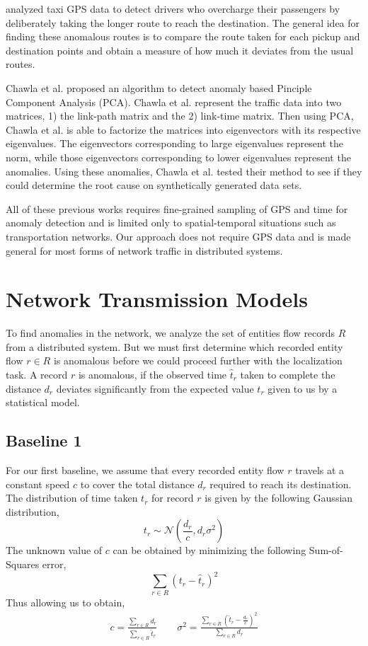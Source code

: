 \documentclass[conference]{IEEEtran.1.8}
\begin{document}
\cite{Ge2011,Zhang2011,Zhang2012} analyzed taxi GPS data to detect drivers who overcharge their passengers by deliberately taking the longer route to reach the destination. The general idea for finding these anomalous routes is to compare the route taken for each pickup and destination points and obtain a measure of how much it deviates from the usual routes.

Chawla et al. \cite{Chawla2012} proposed an algorithm to detect anomaly based Pinciple Component Analysis (PCA). Chawla et al. \cite{Chawla2012} represent the traffic data into two matrices, 1) the link-path matrix and the 2) link-time matrix. Then using PCA, Chawla et al. \cite{Chawla2012} is able to factorize the matrices into eigenvectors with its respective eigenvalues. The eigenvectors corresponding to large eigenvalues represent the norm, while those eigenvectors corresponding to lower eigenvalues represent the anomalies. Using these anomalies, Chawla et al. \cite{Chawla2012} tested their method to see if they could determine the root cause on synthetically generated data sets.

All of these previous works \cite{Chawla2012, Ge2011, Liu2011, Pan2013, Zhang2011, Zhang2012} requires fine-grained sampling of GPS and time for anomaly detection and is limited only to spatial-temporal situations such as transportation networks. Our approach does not require GPS data and is made general for most forms of network traffic in distributed systems.

\section{Network Transmission Models}
\label{sec:models}

To find anomalies in the network, we analyze the set of entities flow records $R$ from a distributed system. But we must first determine which recorded entity flow $r \in R$ is anomalous before we could proceed further with the localization task. A record $r$ is anomalous, if the observed time $\hat{t}_r$ taken to complete the distance $d_r$ deviates significantly from the expected value $t_r$ given to us by a statistical model.

\subsection{Baseline 1}

For our first baseline, we assume that every recorded entity flow $r$ travels at a constant speed $c$ to cover the total distance $d_r$ required to reach its destination. The distribution of time taken $t_r$ for record $r$ is given by the following Gaussian distribution,
\[ t_r \sim \mathcal{N} \left( \frac{d_r}{c}, d_r \sigma^2 \right) \]
The unknown value of $c$ can be obtained by minimizing the following Sum-of-Squares error,
\[ \sum_{r \in R} (t_r - \hat{t}_r)^2 \]
Thus allowing us to obtain,
\begin{gather*}
	c = \frac{\sum_{r \in R} d_r}{\sum_{r \in R} \hat{t}_r} \qquad
    \sigma^2 = \frac{ \sum_{r \in R} \left( \hat{t}_r - \frac{d_r}{c} \right)^2 }{ \sum_{r \in R} d_r }
\end{gather*}
\end{document}
